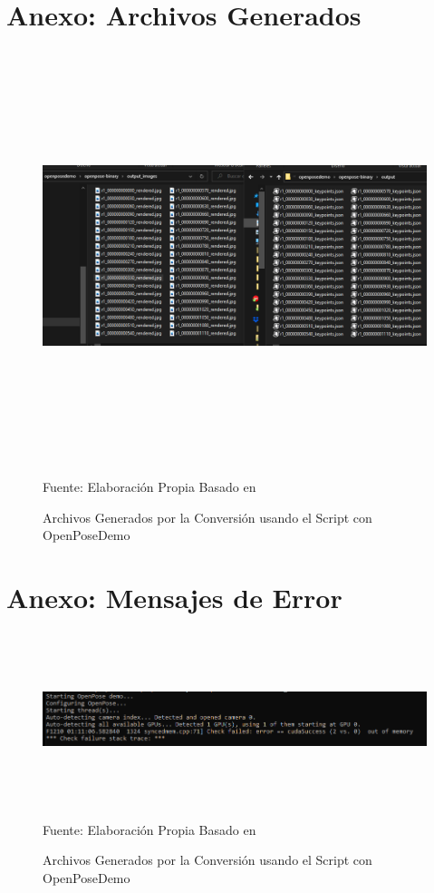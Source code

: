 \begin{landscape}
	\clearpage
	\section{Anexo: Archivos Generados}
	\begin{figure}[b!]
		\centering
			\includegraphics[width=22cm,height=12cm,]{./Images/JSONandJPGexample.png}
		\caption{Archivos Generados por la Conversión usando el Script con OpenPoseDemo}
		\footnotesize Fuente: Elaboración Propia Basado en \cite{8765346}
		\label{videotojsonpjg}
	\end{figure}
\clearpage
\section{Anexo: Mensajes de Error}
	\begin{figure}[h!]
		\centering
		\includegraphics[width=22cm,height=5cm,]{./Images/erroroutofmemory.png}
		\caption{Archivos Generados por la Conversión usando el Script con OpenPoseDemo}
		\footnotesize Fuente: Elaboración Propia Basado en \cite{8765346}
		\label{erroroutofmemory}
	\end{figure}
\end{landscape}

